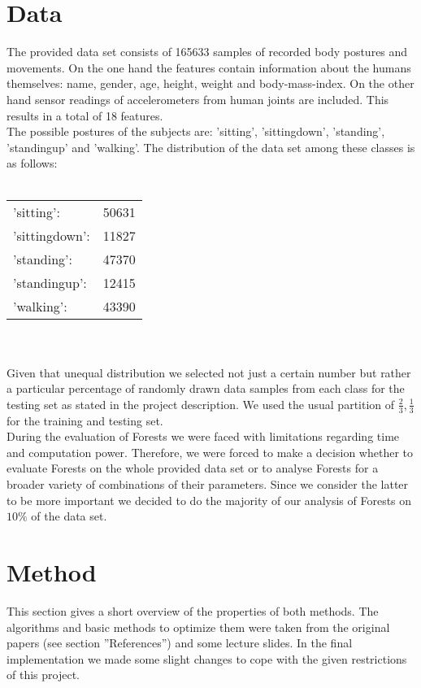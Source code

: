 \documentclass[twocolumn]{article}
\begin{document}
\section{Data}
The provided data set consists of 165633 samples of recorded body postures and movements. On the one hand the features contain information about the humans themselves: name, gender, age, height, weight and body-mass-index. On the other hand sensor readings of accelerometers from human joints are included. This results in a total of 18 features.\\
The possible postures of the subjects are: 'sitting', 'sittingdown', 'standing', 'standingup' and 'walking'. The distribution of the data set among these classes is as follows:\\\\
\begin{tabular}{p{2cm}p{2cm}}
'sitting': & 50631\\
'sittingdown': & 11827\\
'standing': & 47370\\
'standingup': & 12415\\
'walking': & 43390
\end{tabular}\\\\
Given that unequal distribution we selected not just a certain number but rather a particular percentage of randomly drawn data samples from each class for the testing set as stated in the project description. We used the usual partition of $\frac{2}{3}, \frac{1}{3}$ for the training and testing set.\\
During the evaluation of Forests we were faced with limitations regarding time and computation power. Therefore, we were forced to make a decision whether to evaluate Forests on the whole provided data set or to analyse Forests for a broader variety of combinations of their parameters. Since we consider the latter to be more important we decided to do the majority of our analysis of Forests on $10\%$ of the data set.


\section{Method}
This section gives a short overview of the properties of both methods. The algorithms and basic methods to optimize them were taken from the original papers (see section ''References'') and some lecture slides. In the final implementation we made some slight changes to cope with the given restrictions of this project.
\end{document}
